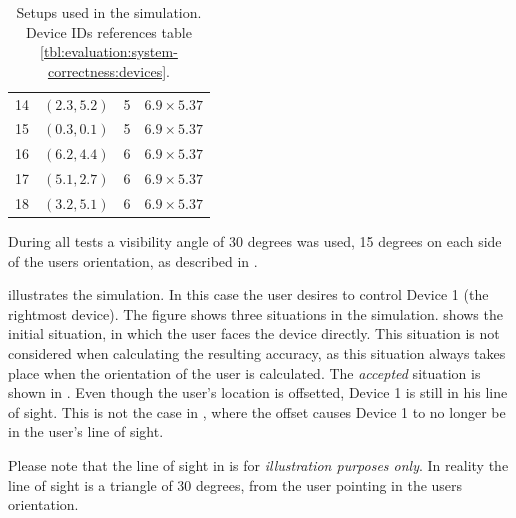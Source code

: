 \begin{table}[!hbt]
\begin{tabular}{c|ccc}
14          & $(2.3 , 5.2)$       & 5                          & $6.9 \times 5.37$     \\
15          & $(0.3 , 0.1)$       & 5                          & $6.9 \times 5.37$     \\
16          & $(6.2 , 4.4)$       & 6                          & $6.9 \times 5.37$     \\
17          & $(5.1 , 2.7)$       & 6                          & $6.9 \times 5.37$     \\
18          & $(3.2 , 5.1)$       & 6                          & $6.9 \times 5.37$    
\end{tabular}
\caption{Setups used in the simulation. Device IDs references table \ref{tbl:evaluation:system-correctness:devices}.}
\label{lst:evaluation:system-correctness:setups}
\end{table}

During all tests a visibility angle of \num{30} degrees was used, 
\ie \num{15} degrees on each side of the users orientation, 
as described in .

 illustrates the simulation. 
In this case the user desires to control Device 1 (the rightmost device). 
The figure shows three situations in the simulation. 
 shows the initial situation, 
in which the user faces the device directly. 
This situation is not considered when calculating the resulting accuracy, 
as this situation always takes place when the orientation of the user is calculated. 
The \emph{accepted} situation is shown in . 
Even though the user's location is offsetted, 
Device 1 is still in his line of sight. 
This is not the case in , 
where the offset causes Device 1 to no longer be in the user's line of sight.

Please note that the line of sight in  is for \emph{illustration purposes only}. 
In reality the line of sight is a triangle of \num{30} degrees, 
from the user pointing in the users orientation.

